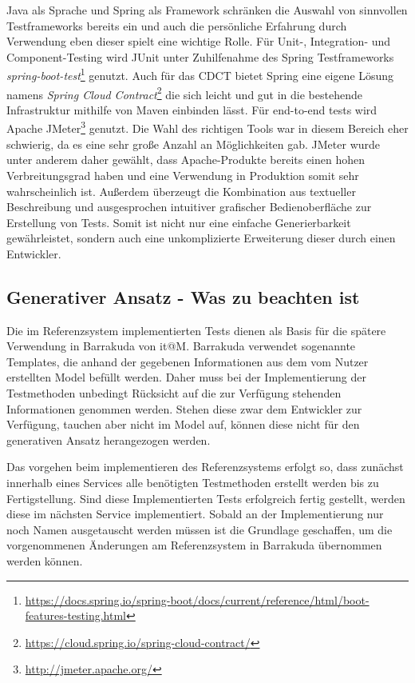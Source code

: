\documentclass[12pt,a4paper,bibliography=totocnumbered,listof=totocnumbered]{scrartcl}
\begin{document}
Java als Sprache und Spring als Framework schränken die Auswahl von sinnvollen Testframeworks bereits ein und auch die persönliche Erfahrung durch Verwendung eben dieser spielt eine wichtige Rolle. Für Unit-, Integration- und Component-Testing wird JUnit unter Zuhilfenahme des Spring Testframeworks \textit{spring-boot-test}\footnote{\url{https://docs.spring.io/spring-boot/docs/current/reference/html/boot-features-testing.html}} genutzt.
Auch für das \ac{CDCT} bietet Spring eine eigene Lösung namens \textit{Spring Cloud Contract}\footnote{\url{https://cloud.spring.io/spring-cloud-contract/}} die sich leicht und gut in die bestehende Infrastruktur mithilfe von Maven einbinden lässt.
Für end-to-end tests wird Apache JMeter\footnote{\url{http://jmeter.apache.org/}} genutzt. Die Wahl des richtigen Tools war in diesem Bereich eher schwierig, da es eine sehr große Anzahl an Möglichkeiten gab. JMeter wurde unter anderem daher gewählt, dass Apache-Produkte bereits einen hohen Verbreitungsgrad haben und eine Verwendung in Produktion somit sehr wahrscheinlich ist. Außerdem überzeugt die Kombination aus textueller Beschreibung und ausgesprochen intuitiver grafischer Bedienoberfläche zur Erstellung von Tests. Somit ist nicht nur eine einfache Generierbarkeit gewährleistet, sondern auch eine unkomplizierte Erweiterung dieser durch einen Entwickler.

\subsection{Generativer Ansatz - Was zu beachten ist}

Die im Referenzsystem implementierten Tests dienen als Basis für die spätere Verwendung in Barrakuda von it@M. Barrakuda verwendet sogenannte Templates, die anhand der gegebenen Informationen aus dem vom Nutzer erstellten Model befüllt werden. Daher muss bei der Implementierung der Testmethoden unbedingt Rücksicht auf die zur Verfügung stehenden Informationen genommen werden. Stehen diese zwar dem Entwickler zur Verfügung, tauchen aber nicht im Model auf, können diese nicht für den generativen Ansatz herangezogen werden.

Das vorgehen beim implementieren des Referenzsystems erfolgt so, dass zunächst innerhalb eines Services alle benötigten Testmethoden erstellt werden bis zu Fertigstellung. Sind diese Implementierten Tests erfolgreich fertig gestellt, werden diese im nächsten Service implementiert. Sobald an der Implementierung nur noch Namen ausgetauscht werden müssen ist die Grundlage geschaffen, um die vorgenommenen Änderungen am Referenzsystem in Barrakuda übernommen werden können.
\end{document}
